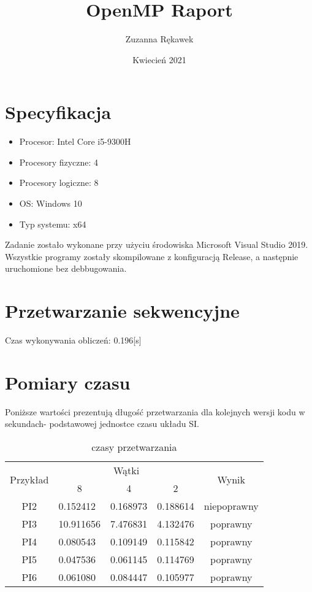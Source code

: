 \documentclass{article}
\title{OpenMP Raport}
\author{Zuzanna Rękawek}
\date{Kwiecień 2021}
\begin{document}
\maketitle

\newpage

\section{Specyfikacja}
\begin{itemize}
    \item Procesor: Intel Core i5-9300H 
    \item Procesory fizyczne: 4
    \item Procesory logiczne: 8
    \item OS: Windows 10
    \item Typ systemu: x64
\end{itemize}
Zadanie zostało wykonane przy użyciu środowiska Microsoft Visual Studio 2019. \\
Wszystkie programy zostały skompilowane z konfiguracją Release, a następnie uruchomione bez debbugowania. 

\section{Przetwarzanie sekwencyjne}
Czas wykonywania obliczeń: 0.196[s]

\section{Pomiary czasu}
Poniższe wartości prezentują długość przetwarzania dla kolejnych wersji kodu w sekundach- podstawowej jednostce czasu układu SI.
\begin{table}[!htb]
\centering
\begin{tabular}{|c|l|l|l|c|}
\hline
\multirow{2}{*}{Przykład} & \multicolumn{3}{c|}{Wątki}                                               & \multirow{2}{*}{Wynik} \\ \cline{2-4}
                      & \multicolumn{1}{c|}{8} & \multicolumn{1}{c|}{4} & \multicolumn{1}{c|}{2} &                        \\ \hline
PI2                   & 0.152412               & 0.168973               & 0.188614               & niepoprawny            \\ \hline
PI3                   & 10.911656              & 7.476831               & 4.132476               & poprawny               \\ \hline
PI4                   & 0.080543               & 0.109149               & 0.115842               & poprawny               \\ \hline
PI5                   & 0.047536               & 0.061145               & 0.114769               & poprawny               \\ \hline
PI6                   & 0.061080               & 0.084447               & 0.105977               & poprawny               \\ \hline
\end{tabular}
\caption{czasy przetwarzania}
\end{table}
\end{document}
